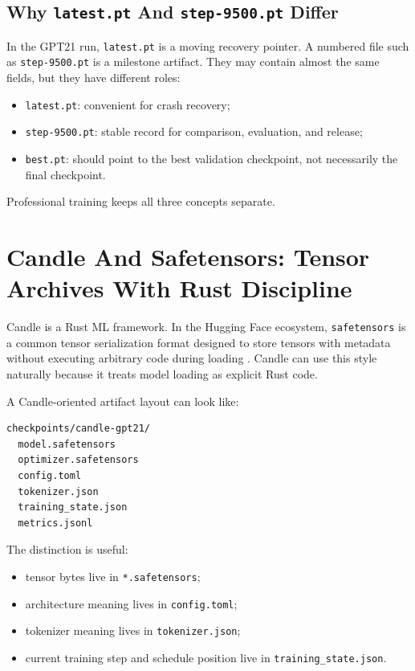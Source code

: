 \subsection{Why \texttt{latest.pt} And \texttt{step-9500.pt} Differ}

In the GPT21 run, \texttt{latest.pt} is a moving recovery pointer. A numbered file such as
\texttt{step-9500.pt} is a milestone artifact. They may contain almost the same fields,
but they have different roles:

\begin{itemize}
  \item \texttt{latest.pt}: convenient for crash recovery;
  \item \texttt{step-9500.pt}: stable record for comparison, evaluation, and release;
  \item \texttt{best.pt}: should point to the best validation checkpoint, not necessarily
  the final checkpoint.
\end{itemize}

Professional training keeps all three concepts separate.

\section{Candle And Safetensors: Tensor Archives With Rust Discipline}

Candle is a Rust ML framework. In the Hugging Face ecosystem, \texttt{safetensors} is a
common tensor serialization format designed to store tensors with metadata without
executing arbitrary code during loading \cite{huggingfacesafetensors}. Candle can use this
style naturally because it treats model loading as explicit Rust code.

A Candle-oriented artifact layout can look like:

\begin{lstlisting}
checkpoints/candle-gpt21/
  model.safetensors
  optimizer.safetensors
  config.toml
  tokenizer.json
  training_state.json
  metrics.jsonl
\end{lstlisting}

The distinction is useful:

\begin{itemize}
  \item tensor bytes live in \texttt{*.safetensors};
  \item architecture meaning lives in \texttt{config.toml};
  \item tokenizer meaning lives in \texttt{tokenizer.json};
  \item current training step and schedule position live in \texttt{training\_state.json}.
\end{itemize}

